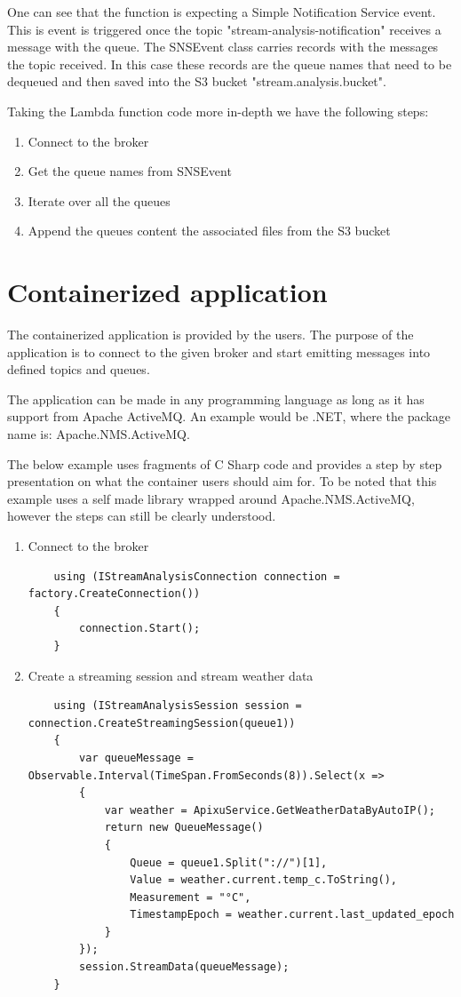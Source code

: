 One can see that the function is expecting a Simple Notification Service event. This is event is triggered once the topic "stream-analysis-notification" receives a message with the queue. The SNSEvent class carries records with the messages the topic received. In this case these records are the queue names that need to be dequeued and then saved into the S3 bucket "stream.analysis.bucket".

Taking the Lambda function code more in-depth we have the following steps:

\begin{enumerate}
	\item Connect to the broker
	\item Get the queue names from SNSEvent
	\item Iterate over all the queues
	\item Append the queues content the associated files from the S3 bucket
\end{enumerate}


\section{Containerized application}
\label{chap:04:04}

The containerized application is provided by the users. The purpose of the application is to connect to the given broker and start emitting messages into defined topics and queues.

The application can be made in any programming language as long as it has support from Apache ActiveMQ. An example would be .NET, where the package name is: Apache.NMS.ActiveMQ.

The below example uses fragments of C Sharp code and provides a step by step presentation on what the container users should aim for. To be noted that this example uses a self made library wrapped around Apache.NMS.ActiveMQ, however the steps can still be clearly understood.

\begin{enumerate}
	\item Connect to the broker

	\begin{lstlisting}
	using (IStreamAnalysisConnection connection = factory.CreateConnection())
	{
		connection.Start();
	}
	\end{lstlisting}
	
	\item Create a streaming session and stream weather data
	\begin{lstlisting}
	using (IStreamAnalysisSession session = connection.CreateStreamingSession(queue1))
	{
		var queueMessage = Observable.Interval(TimeSpan.FromSeconds(8)).Select(x =>
		{
			var weather = ApixuService.GetWeatherDataByAutoIP();
			return new QueueMessage()
			{
				Queue = queue1.Split("://")[1],
				Value = weather.current.temp_c.ToString(),
				Measurement = "°C",
				TimestampEpoch = weather.current.last_updated_epoch
			}
		});
		session.StreamData(queueMessage);
	}
	\end{lstlisting}

\end{enumerate}

